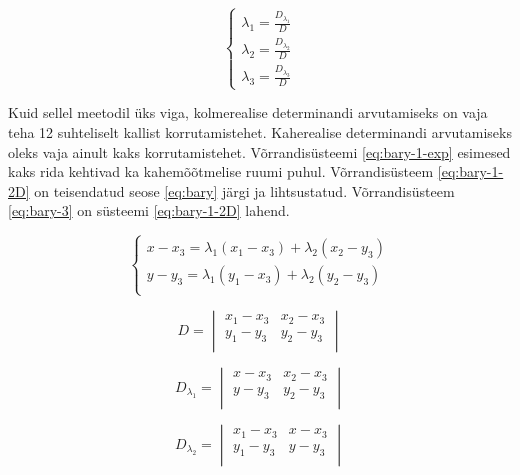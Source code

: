 \documentclass[a4paper,12pt]{report}
\begin{document}
\begin{equation} \label{eq:bary-2}  
  \left\{
  \begin{array}{l}
    \lambda_1 = \frac{D_{\lambda_1}}{D} \\
    \lambda_2 = \frac{D_{\lambda_2}}{D} \\
    \lambda_3 = \frac{D_{\lambda_3}}{D}
  \end{array}
  \right.
\end{equation}

Kuid sellel meetodil üks viga, kolmerealise determinandi arvutamiseks on vaja
teha 12 suhteliselt kallist korrutamistehet. Kaherealise determinandi
arvutamiseks oleks vaja ainult kaks korrutamistehet. Võrrandisüsteemi
\ref{eq:bary-1-exp} esimesed kaks rida kehtivad ka kahemõõtmelise ruumi puhul.
Võrrandisüsteem \ref{eq:bary-1-2D} on teisendatud seose \ref{eq:bary} järgi ja
lihtsustatud. Võrrandisüsteem \ref{eq:bary-3} on süsteemi \ref{eq:bary-1-2D}
lahend.

\begin{equation} \label{eq:bary-1-2D}
  \left\{
  \begin{array}{l}
    x-x_3 = \lambda_1(x_1-x_3)+\lambda_2(x_2-y_3) \\
    y-y_3 = \lambda_1(y_1-x_3)+\lambda_2(y_2-y_3) \\
  \end{array}
  \right.
\end{equation}

\begin{center}
\begin{minipage}{0.3\textwidth}
  \[
    D =
    \begin{vmatrix}
      x_1 - x_3 & x_2 - x_3 \\
      y_1 - y_3 & y_2 - y_3 \\
    \end{vmatrix}
  \]
\end{minipage}
\begin{minipage}{0.3\textwidth}
  \[
    D_{\lambda_1} =
    \begin{vmatrix}
      x - x_3 & x_2 - x_3 \\
      y - y_3 & y_2 - y_3 \\
    \end{vmatrix}
  \]
\end{minipage}
\begin{minipage}{0.3\textwidth}
  \[
    D_{\lambda_2} = 
    \begin{vmatrix}
      x_1 - x_3 & x - x_3 \\
      y_1 - y_3 & y - y_3 \\
    \end{vmatrix}
  \]
\end{minipage}
\end{center}
  
\end{document}
